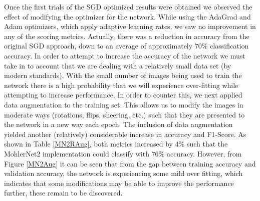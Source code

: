 \documentclass[12pt]{article}
\begin{document}
Once the first trials of the SGD optimized results were obtained we observed the effect of modifying the optimizer for the network. While using the AdaGrad and Adam optimizers, which apply adaptive learning rates, we saw no improvement in any of the scoring metrics. Actually, there was a reduction in accuracy from the original SGD approach, down to an average of approximately $70\%$ classification accuracy. In order to attempt to increase the accuracy of the network we must take in to account that we are dealing with a relatively small data set (by modern standards). With the small number of images being used to train the network there is a high probability that we will experience over-fitting while attempting to increase performance. In order to counter this, we next applied data augmentation to the training set. This allows us to modify the images in moderate ways (rotations, flips, sheering, etc.) such that they are presented to the network in a new way each epoch. The inclusion of data augmentation yielded another (relatively) considerable increase in accuracy and F1-Score. As shown in Table \ref{MN2RAug}, both metrics increased by $4\%$ such that the MohlerNet2 implementation could classify with $76\%$ accuracy. However, from Figure \ref{MN2Aug} it can be seen that from the gap between training accuracy and validation accuracy, the network is experiencing some mild over fitting, which indicates that some modifications may be able to improve the performance further, these remain to be discovered.
\end{document}
